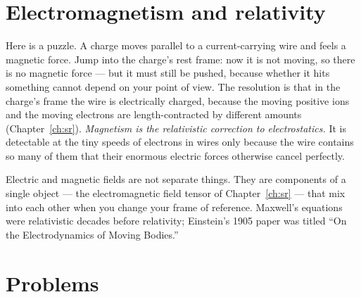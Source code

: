 \section{Electromagnetism and relativity}
\label{sec:em-relativity}

Here is a puzzle. A charge moves parallel to a current-carrying wire and feels a magnetic force. Jump into the charge's rest frame: now it is not moving, so there is no magnetic force --- but it must still be pushed, because whether it hits something cannot depend on your point of view. The resolution is that in the charge's frame the wire is electrically charged, because the moving positive ions and the moving electrons are length-contracted by different amounts (Chapter~\ref{ch:sr}). \emph{Magnetism is the relativistic correction to electrostatics.} It is detectable at the tiny speeds of electrons in wires only because the wire contains so many of them that their enormous electric forces otherwise cancel perfectly.

\begin{keyidea}
Electric and magnetic fields are not separate things. They are components of a single object --- the electromagnetic field tensor of Chapter~\ref{ch:sr} --- that mix into each other when you change your frame of reference. Maxwell's equations were relativistic decades before relativity; Einstein's 1905 paper was titled ``On the Electrodynamics of Moving Bodies.''
\end{keyidea}

\section{Problems}


